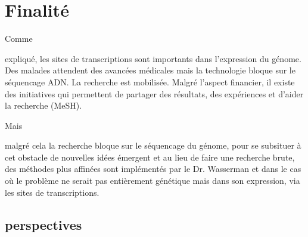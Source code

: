 \section{Finalité}


\begin{hspace}{1cm}
Comme
\end{hspace}
expliqué, les sites de transcriptions sont importants dans l'expression du génome. Des malades attendent des avancées médicales mais la technologie bloque sur le séquencage ADN.  La recherche est mobilisée. Malgré l'aspect financier, il existe des initiatives qui permettent de partager des résultats, des expériences et d'aider la recherche (MeSH). 
\newline

\begin{hspace}{1cm}
Mais
\end{hspace} malgré cela la recherche bloque sur le séquencage du génome, pour se subsituer à cet obstacle de nouvelles idées émergent et au lieu de faire une recherche brute, des méthodes plus affinées sont implémentés par le Dr. Wasserman et dans le cas où le problème ne serait pas entièrement génétique mais dans son expression, via les sites de transcriptions. 
\newline

\subsection{perspectives}
